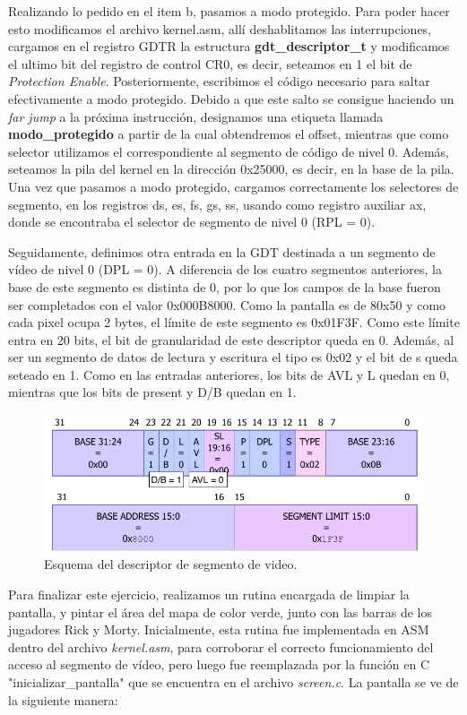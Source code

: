 \documentclass[a4paper]{article}
\begin{document}
\justify
Realizando lo pedido en el item b, pasamos a modo protegido. Para poder hacer esto modificamos el archivo kernel.asm, allí deshablitamos las interrupciones, cargamos en el registro GDTR la estructura \textbf{gdt_descriptor_t} y modificamos el ultimo bit del registro de control CR0, es decir, seteamos en 1 el bit de \textit{Protection Enable}. Posteriormente, escribimos el código necesario para saltar efectivamente a modo protegido. Debido a que este salto se consigue haciendo un \textit{far jump} a la próxima instrucción, designamos una etiqueta llamada \textbf{modo_protegido} a partir de la cual obtendremos el offset, mientras que como selector utilizamos el correspondiente al segmento de código de nivel 0. Además, seteamos la pila del kernel en la dirección 0x25000, es decir, en la base de la pila. Una vez que pasamos a modo protegido, cargamos correctamente los selectores de segmento, en los registros ds, es, fs, gs, ss, usando como registro auxiliar ax, donde se encontraba el selector de segmento de nivel 0 (RPL = 0).


\justify
Seguidamente, definimos otra entrada en la GDT destinada a un segmento de vídeo de nivel 0 (DPL = 0). A diferencia de los cuatro segmentos anteriores, la base de este segmento es distinta de 0, por lo que los campos de la base fueron ser completados con el valor 0x000B8000. Como la pantalla es de 80x50 y como cada pixel ocupa 2 bytes, el límite de este segmento es 0x01F3F. Como este límite entra en 20 bits, el bit de granularidad de este descriptor queda en 0. Además, al ser un segmento de datos de lectura y escritura el tipo es 0x02 y el bit de s queda seteado en 1. Como en las entradas anteriores, los bits de AVL y L quedan en 0, mientras que los bits de present y D/B quedan en 1.  

\begin{figure}[h]
	\centering
	\includegraphics[scale=0.8]{img/DescriptorVideo.pdf}
	\caption{Esquema del descriptor de segmento de video.}
\end{figure}

\justify
Para finalizar este ejercicio, realizamos un rutina encargada de limpiar la pantalla, y pintar el área del mapa de color verde, junto con las barras de los jugadores Rick y Morty. Inicialmente, esta rutina fue implementada en ASM dentro del archivo \textit{kernel.asm}, para corroborar el correcto funcionamiento del acceso al segmento de vídeo, pero luego fue reemplazada por la función en C  "inicializar_pantalla" que se encuentra en el archivo \textit{screen.c}. La pantalla se ve de la siguiente manera:
\end{document}
